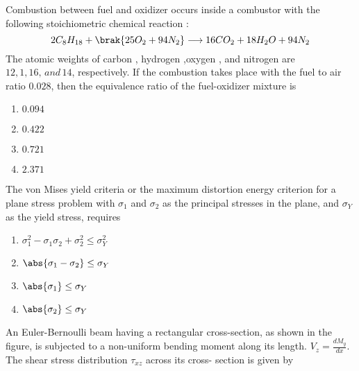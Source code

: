  \iffalse
\chapter{2007}
\author{EE24BTECH11021 - Eshan Ray}
\section{ae}
\fi
    \item Combustion between fuel  and oxidizer  occurs inside a combustor with the following stoichiometric chemical reaction $\colon$
    $$2C_{8}H_{18}+\brak{25O_2+94N_2}\longrightarrow 16CO_2+18H_2O+94N_2$$
    The atomic weights of carbon , hydrogen ,oxygen , and nitrogen  are $12,1,16,\, and\,14$, respectively. If the combustion takes place  with the fuel to air ratio $0.028$, then the equivalence ratio of the fuel-oxidizer mixture is
    \begin{enumerate}
        \item $0.094$
        \item $0.422$
        \item $0.721$
        \item $2.371$
    \end{enumerate}
    \item The von Mises yield criteria or the maximum distortion energy criterion for a plane stress problem with $\sigma_1$ and $\sigma_2$ as the principal stresses in the plane, and $\sigma_Y$ as the yield stress, requires
    \begin{enumerate}
        \item $\sigma_1^2-\sigma_1\sigma_2+\sigma_2^2\leq \sigma_Y^2$
        \item $\abs{\sigma_1-\sigma_2}\leq\sigma_Y$
        \item $\abs{\sigma_1}\leq \sigma_Y$
        \item $\abs{\sigma_2}\leq\sigma_Y$
    \end{enumerate}
    \item An Euler-Bernoulli beam having a rectangular cross-section, as shown in the figure, is subjected to a non-uniform bending moment along its length. $V_z=\frac{dM_y}{dx}$. The shear stress distribution $\tau_{xz}$ across its cross- section is given by 

